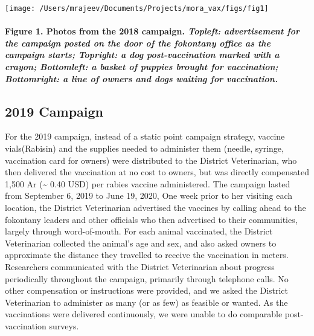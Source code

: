 \documentclass[tropicalmed,article,submit,moreauthors,pdftex]{mdpi}
\begin{document}
\texttt{[image: /Users/mrajeev/Documents/Projects/mora\_vax/figs/fig1]}

\hypertarget{figure-1.-photos-from-the-2018-campaign.-topleft-advertisement-for-the-campaign-posted-on-the-door-of-the-fokontany-office-as-the-campaign-starts-topright-a-dog-post-vaccination-marked-with-a-crayon-bottomleft-a-basket-of-puppies-brought-for-vaccination-bottomright-a-line-of-owners-and-dogs-waiting-for-vaccination.}{%
\paragraph{\texorpdfstring{\textbf{Figure 1. Photos from the 2018
campaign}. \emph{Topleft: advertisement for the campaign posted on the
door of the fokontany office as the campaign starts; Topright: a dog
post-vaccination marked with a crayon; Bottomleft: a basket of puppies
brought for vaccination; Bottomright: a line of owners and dogs waiting
for
vaccination.}}{Figure 1. Photos from the 2018 campaign. Topleft: advertisement for the campaign posted on the door of the fokontany office as the campaign starts; Topright: a dog post-vaccination marked with a crayon; Bottomleft: a basket of puppies brought for vaccination; Bottomright: a line of owners and dogs waiting for vaccination.}}\label{figure-1.-photos-from-the-2018-campaign.-topleft-advertisement-for-the-campaign-posted-on-the-door-of-the-fokontany-office-as-the-campaign-starts-topright-a-dog-post-vaccination-marked-with-a-crayon-bottomleft-a-basket-of-puppies-brought-for-vaccination-bottomright-a-line-of-owners-and-dogs-waiting-for-vaccination.}}

\hypertarget{campaign-1}{%
\subsection{2019 Campaign}\label{campaign-1}}

For the 2019 campaign, instead of a static point campaign strategy,
vaccine vials(Rabisin) and the supplies needed to administer them
(needle, syringe, vaccination card for owners) were distributed to the
District Veterinarian, who then delivered the vaccination at no cost to
owners, but was directly compensated 1,500 Ar (\textasciitilde{} 0.40
USD) per rabies vaccine administered. The campaign lasted from September
6, 2019 to June 19, 2020, One week prior to her visiting each location,
the District Veterinarian advertised the vaccines by calling ahead to
the fokontany leaders and other officials who then advertised to their
communities, largely through word-of-mouth. For each animal vaccinated,
the District Veterinarian collected the animal's age and sex, and also
asked owners to approximate the distance they travelled to receive the
vaccination in meters. Researchers communicated with the District
Veterinarian about progress periodically throughout the campaign,
primarily through telephone calls. No other compensation or instructions
were provided, and we asked the District Veterinarian to administer as
many (or as few) as feasible or wanted. As the vaccinations were
delivered continuously, we were unable to do comparable post-vaccination
surveys.
\end{document}
